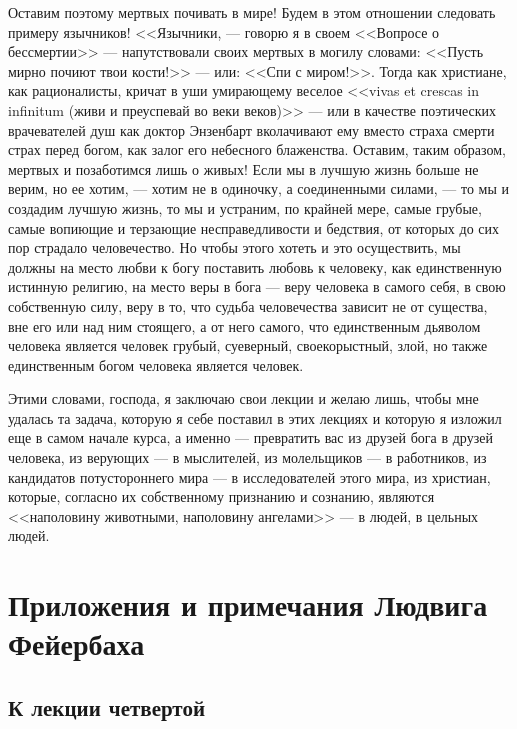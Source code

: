 \documentclass[12pt]{article}
\begin{document}
Оставим поэтому мертвых почивать в мире! Будем в этом отношении следовать примеру язычников! <<Язычники, --- говорю я в своем <<Вопросе о бессмертии>>  --- напутствовали своих мертвых в могилу словами: <<Пусть мирно почиют твои кости!>> --- или: <<Спи с миром!>>. Тогда как христиане, как рационалисты, кричат в уши умирающему веселое <<vivas et crescas in infinitum (живи и преуспевай во веки веков)>> --- или в качестве поэтических врачевателей душ как доктор Энзенбарт вколачивают ему вместо страха смерти страх перед богом, как залог его небесного блаженства. Оставим, таким образом, мертвых и позаботимся лишь о живых! Если мы в лучшую жизнь больше не верим, но ее хотим, --- хотим не в одиночку, а соединенными силами, --- то мы и создадим лучшую жизнь, то мы и устраним, по крайней мере, самые грубые, самые вопиющие и терзающие несправедливости и бедствия, от которых до сих пор страдало человечество. Но чтобы этого хотеть и это осуществить, мы должны на место любви к богу поставить любовь к человеку, как единственную истинную религию, на место веры в бога --- веру человека в самого себя, в свою собственную силу, веру в то, что судьба человечества зависит не от существа, вне его или над ним стоящего, а от него самого, что единственным дьяволом человека является человек грубый, суеверный, своекорыстный, злой, но также единственным богом человека является человек. 

Этими словами, господа, я заключаю свои лекции и желаю лишь, чтобы мне удалась та задача, которую я себе поставил в этих лекциях и которую я изложил еще в самом начале курса, а именно --- превратить вас из друзей бога в друзей человека, из верующих --- в мыслителей, из молельщиков --- в работников, из кандидатов потустороннего мира --- в исследователей этого мира, из христиан, которые, согласно их собственному признанию и сознанию, являются <<наполовину животными, наполовину ангелами>>  --- в людей, в цельных людей. 

{}
\section*{Приложения и примечания Людвига Фейербаха}

{}
\subsection*{К лекции четвертой}
\end{document}
